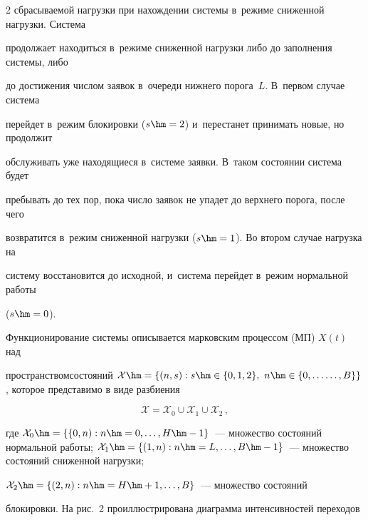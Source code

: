 \begin{multicols}{2}
сбрасываемой нагрузки при нахождении сис\-те\-мы в~режиме сниженной нагрузки. Сис\-те\-ма 


продолжает находиться в~режиме сниженной нагрузки либо до заполнения сис\-те\-мы, либо 


до достижения чис\-лом заявок в~очереди нижнего порога~$L$. В~первом случае сис\-те\-ма 


перейдет в~режим блокировки ($s\hm=2$) и~перестанет принимать новые, но продолжит 


обслуживать уже на\-хо\-дя\-щи\-еся в~сис\-те\-ме заявки. В~таком состоянии сис\-те\-ма будет 


пребывать до тех пор, пока чис\-ло заявок не упадет до верх\-не\-го порога, после чего 


возвратится в~режим сниженной нагрузки ($s\hm=1$). Во втором случае нагрузка на 


систему восстановится до исходной, и~сис\-те\-ма перейдет в~режим нормальной работы 


($s\hm=0$).


{





}


  


  Функционирование системы описывается марковским процессом (МП) $X(t)$ над 


пространством\linebreak состояний $\mathcal{X}\hm= \{ (n,s): s\hm\in \{0,1,2\},\ n\hm\in \{0,\ldots\linebreak


\ldots , B\}\}$, которое представимо в виде раз\-биения 


$$


\mathcal{X}= \mathcal{X}_0\cup 


\mathcal{X}_1 \cup \mathcal{X}_2\,,


$$


 где $\mathcal{X}_0\hm= \{\{ 0,n): n\hm=0,\ldots , 


H\hm-1\}$~--- множество состояний нормальной работы; $\mathcal{X}_1\hm= \{ (1,n): 


n\hm= L,\ldots , B\hm-1\}$~--- множество состояний сниженной нагрузки; 


$\mathcal{X}_2\hm= \{ (2,n): n\hm= H\hm+1,\ldots , B\}$~--- множество состояний 


блокировки. На рис.~2 проиллюстрирована диаграмма интенсивностей переходов 



\end{multicols}
